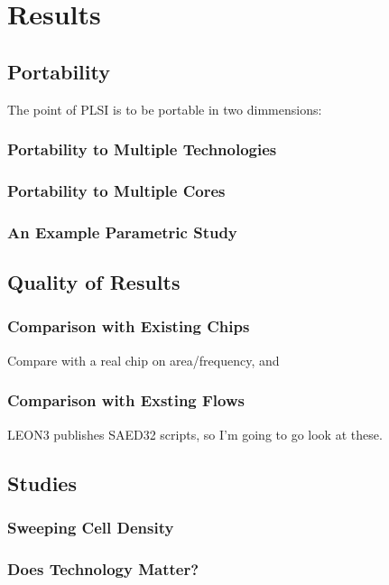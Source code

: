 \documentclass{article}
\begin{document}
\chapter{Results}

\section{Portability}

The point of PLSI is to be portable in two dimmensions: 

\subsection{Portability to Multiple Technologies}


\subsection{Portability to Multiple Cores}

\subsection{An Example Parametric Study}

\section{Quality of Results}

\subsection{Comparison with Existing Chips}

Compare with a real chip on area/frequency, and 

\subsection{Comparison with Exsting Flows}

LEON3 publishes SAED32 scripts, so I'm going to go look at these.

\section{Studies}

\subsection{Sweeping Cell Density}

\subsection{Does Technology Matter?}
\end{document}
